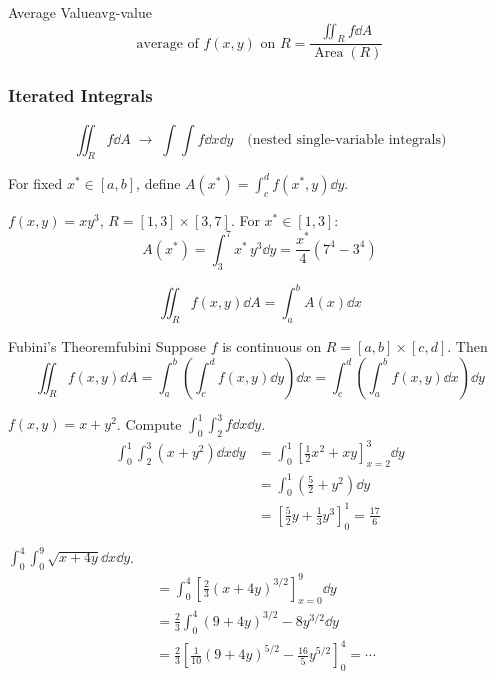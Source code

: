 \begin{definition}{Average Value}{avg-value}
  \[
    \text{average of } f(x,y) \text{ on } R
    = \frac{\iint_R f\dd{A}}{\operatorname{Area}(R)}
  \]
\end{definition}

\subsubsection{Iterated Integrals}

\[
  \iint_R f\dd{A}
  \;\longrightarrow\;
  \int\!\!\int f\dd{x}\dd{y}
  \quad\text{(nested single-variable integrals)}
\]

For fixed $x^{*}\in[a,b]$, define
$\displaystyle A(x^{*}) = \int_c^d f(x^{*},y)\dd{y}$.

\begin{example}
  $f(x,y) = xy^3$, \; $R = [1,3]\times[3,7]$.
  For $x^{*}\in[1,3]$:
  \[
    A(x^{*}) = \int_3^7 x^{*}\,y^3\dd{y}
    = \frac{x^{*}}{4}(7^4 - 3^4)
  \]
\end{example}

\[
  \iint_R f(x,y)\dd{A} = \int_a^b A(x)\dd{x}
\]

\begin{theorem}{Fubini's Theorem}{fubini}
  Suppose $f$ is continuous on $R = [a,b]\times[c,d]$. Then
  \[
    \iint_R f(x,y)\dd{A}
    = \int_a^b\!\left(\int_c^d f(x,y)\dd{y}\right)\dd{x}
    = \int_c^d\!\left(\int_a^b f(x,y)\dd{x}\right)\dd{y}
  \]
\end{theorem}

\begin{example}
  $f(x,y) = x + y^2$. Compute $\displaystyle\int_0^1\!\int_2^3 f\dd{x}\dd{y}$.
  \begin{align*}
    \int_0^1\!\int_2^3 (x+y^2)\dd{x}\dd{y}
     & = \int_0^1 \left[\frac{1}{2}x^2 + xy\right]_{x=2}^{3}\dd{y} \\
     & = \int_0^1 \left(\tfrac{5}{2} + y^2\right)\dd{y}            \\[4pt]
     & = \left[\frac{5}{2}y + \frac{1}{3}y^3\right]_0^1
    = \frac{17}{6}
  \end{align*}
\end{example}

\begin{example}
  $\displaystyle\int_0^4\!\int_0^9 \sqrt{x+4y}\dd{x}\dd{y}$.
  \begin{align*}
     & = \int_0^4 \left[\frac{2}{3}(x+4y)^{3/2}\right]_{x=0}^{9}\dd{y} \\
     & = \frac{2}{3}\int_0^4 (9+4y)^{3/2} - 8y^{3/2}\dd{y}             \\
     & = \frac{2}{3}\left[\frac{1}{10}(9+4y)^{5/2}
      - \frac{16}{5}y^{5/2}\right]_0^4
    = \cdots
  \end{align*}
\end{example}

